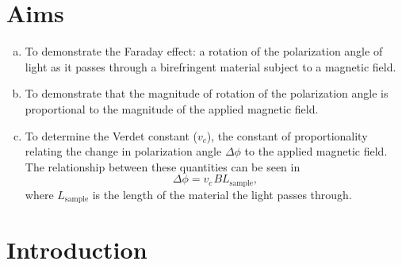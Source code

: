 \documentclass[prb,preprint]{revtex4-1}
\begin{document}
\maketitle 
\section{Aims}
{
\begin{enumerate}[(a)]
\item To demonstrate the Faraday effect: a rotation of the polarization angle of light as it passes through a birefringent material subject to a magnetic field.

\item To demonstrate that the magnitude of rotation of the polarization angle is proportional to the magnitude of the applied magnetic field.

\item{To determine the Verdet constant ($v_c$), the constant of proportionality relating the change in polarization angle $\Delta \phi$ to the applied magnetic field. The relationship between these quantities can be seen in
\begin{equation}
\label{vconst}
\Delta \phi =v_c \hspace{1pt}B L{_{\textrm{sample}}},
\end{equation}
where $L_{\textrm{sample}}$ is the length of the material the light passes through.}
\end{enumerate}

}
\section{Introduction} 
\end{document}
